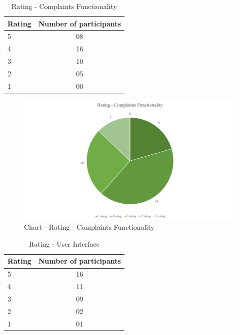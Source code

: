 \begin {itemize}
\begin{table} [h]
\centering
\begin{tabular}{|l|c|}
\hline
Rating & Number of participants \\
\hline
5	&08 \\
4	&16 \\
3	&10 \\
2	&05 \\
1	&00 \\
\hline
\end{tabular}
\caption{Rating - Complaints Functionality}
\label{table-survey-rating-ComplaintsFunctionality}
\end{table}

\begin {figure} [h]
\centering
\includegraphics [scale=0.5] {ratingComplaintsFunctionality}
\caption [Chart - Rating - Complaints Functionality] {Chart - Rating - Complaints Functionality}
\label {image-ratingComplaintsFunctionality}
\end {figure}

\begin{table} [h]
\centering
\begin{tabular}{|l|c|}
\hline
Rating & Number of participants \\
\hline
5	&16 \\
4	&11 \\
3	&09 \\
2	&02 \\
1	&01 \\
\hline
\end{tabular}
\caption{Rating - User Interface}
\label{table-survey-rating-UserInterface}
\end{table}


\end{itemize}
